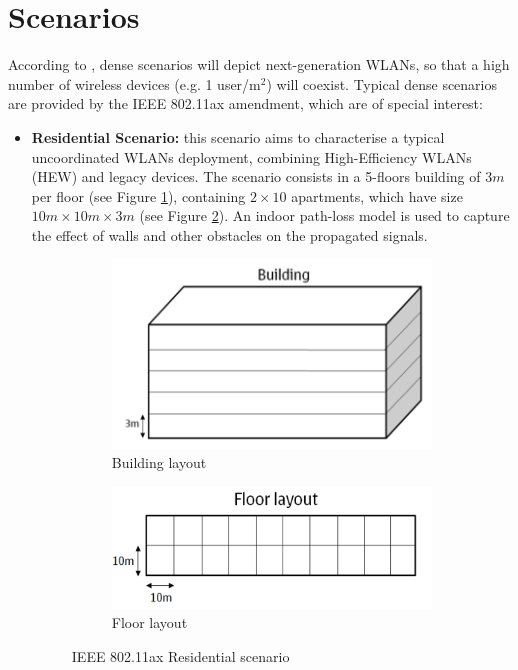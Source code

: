 \documentclass[12pt, a4paper,twoside]{tesi_upf}
\begin{document}
		\section{Scenarios}
		\label{section:scenarios}	
		According to \cite{bellalta2016ieee}, dense scenarios will depict next-generation WLANs, so that a high number of wireless devices (e.g. 1 user/m$^2$) will coexist. Typical dense scenarios are provided by the IEEE 802.11ax amendment, which are of special interest:
		\begin{itemize}			
			\item \textbf{Residential Scenario:} this scenario aims to characterise a typical uncoordinated WLANs deployment, combining High-Efficiency WLANs (HEW) and legacy devices. The scenario consists in a 5-floors building of $3 m$ per floor (see Figure \ref{fig:building}), containing $2 \times 10$ apartments, which have size $10 m \times 10 m \times 3 m$ (see Figure \ref{fig:floor}). An indoor path-loss model is used to capture the effect of walls and other obstacles on the propagated signals. 
			\begin{figure}[h!]
				\centering
				\begin{subfigure}[b]{0.4\textwidth}
					\includegraphics[width=\textwidth]{images/residential_ax_1}
					\caption{Building layout}
					\label{fig:building}
				\end{subfigure}
				\begin{subfigure}[b]{0.4\textwidth}
					\includegraphics[width=\textwidth]{images/residential_ax_2}
					\caption{Floor layout}
					\label{fig:floor}
				\end{subfigure}		
				\caption{IEEE 802.11ax Residential scenario}
				\label{fig:ax_residential_scenario}
			\end{figure}	
				

\end{itemize}
\end{document}
